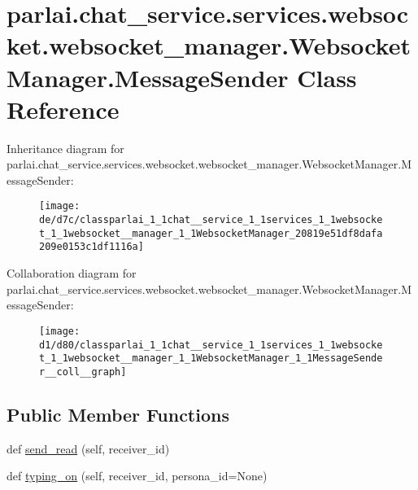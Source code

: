 \hypertarget{classparlai_1_1chat__service_1_1services_1_1websocket_1_1websocket__manager_1_1WebsocketManager_1_1MessageSender}{}\section{parlai.\+chat\+\_\+service.\+services.\+websocket.\+websocket\+\_\+manager.\+Websocket\+Manager.\+Message\+Sender Class Reference}
\label{classparlai_1_1chat__service_1_1services_1_1websocket_1_1websocket__manager_1_1WebsocketManager_1_1MessageSender}


Inheritance diagram for parlai.\+chat\+\_\+service.\+services.\+websocket.\+websocket\+\_\+manager.\+Websocket\+Manager.\+Message\+Sender\+:\nopagebreak
\begin{figure}[H]
\begin{center}
\leavevmode
\texttt{[image: de/d7c/classparlai\_1\_1chat\_\_service\_1\_1services\_1\_1websocket\_1\_1websocket\_\_manager\_1\_1WebsocketManager\_20819e51df8dafa209e0153c1df1116a]}
\end{center}
\end{figure}


Collaboration diagram for parlai.\+chat\+\_\+service.\+services.\+websocket.\+websocket\+\_\+manager.\+Websocket\+Manager.\+Message\+Sender\+:\nopagebreak
\begin{figure}[H]
\begin{center}
\leavevmode
\texttt{[image: d1/d80/classparlai\_1\_1chat\_\_service\_1\_1services\_1\_1websocket\_1\_1websocket\_\_manager\_1\_1WebsocketManager\_1\_1MessageSender\_\_coll\_\_graph]}
\end{center}
\end{figure}
\subsection*{Public Member Functions}
\begin{DoxyCompactItemize}
\item 
def \hyperlink{classparlai_1_1chat__service_1_1services_1_1websocket_1_1websocket__manager_1_1WebsocketManager_1_1MessageSender_ab5aa744f9945196012c2fed3a29779dd}{send\+\_\+read} (self, receiver\+\_\+id)
\item 
def \hyperlink{classparlai_1_1chat__service_1_1services_1_1websocket_1_1websocket__manager_1_1WebsocketManager_1_1MessageSender_a3506683d0a5ab2fd03a585d4bfe51c92}{typing\+\_\+on} (self, receiver\+\_\+id, persona\+\_\+id=None)
\end{DoxyCompactItemize}


